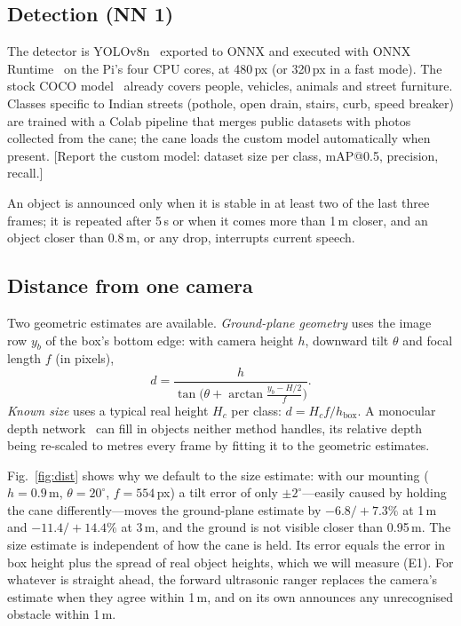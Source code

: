 \documentclass[conference]{IEEEtran}
\newcommand{\tbd}[1]{\textcolor{tbd}{[#1]}}
\begin{document}
\subsection{Detection (NN 1)}
The detector is YOLOv8n~\cite{yolov8} exported to ONNX and executed with ONNX Runtime~\cite{onnxruntime} on the Pi's four CPU cores, at 480\,px (or 320\,px in a fast mode). The stock COCO model~\cite{lin2014} already covers people, vehicles, animals and street furniture. Classes specific to Indian streets (pothole, open drain, stairs, curb, speed breaker) are trained with a Colab pipeline that merges public datasets with photos collected from the cane; the cane loads the custom model automatically when present. \tbd{Report the custom model: dataset size per class, mAP@0.5, precision, recall.}

An object is announced only when it is stable in at least two of the last three frames; it is repeated after 5\,s or when it comes more than 1\,m closer, and an object closer than 0.8\,m, or any drop, interrupts current speech.

\subsection{Distance from one camera}
Two geometric estimates are available. \emph{Ground-plane geometry} uses the image row $y_b$ of the box's bottom edge: with camera height $h$, downward tilt $\theta$ and focal length $f$ (in pixels),
\begin{equation}
d = \frac{h}{\tan\!\big(\theta + \arctan\frac{y_b - H/2}{f}\big)}.
\end{equation}
\emph{Known size} uses a typical real height $H_c$ per class: $d = H_c f / h_{\text{box}}$. A monocular depth network~\cite{ranftl2022} can fill in objects neither method handles, its relative depth being re-scaled to metres every frame by fitting it to the geometric estimates.

Fig.~\ref{fig:dist} shows why we default to the size estimate: with our mounting ($h=0.9$\,m, $\theta=20^\circ$, $f=554$\,px) a tilt error of only $\pm2^\circ$---easily caused by holding the cane differently---moves the ground-plane estimate by $-6.8/+7.3\%$ at 1\,m and $-11.4/+14.4\%$ at 3\,m, and the ground is not visible closer than 0.95\,m. The size estimate is independent of how the cane is held. Its error equals the error in box height plus the spread of real object heights, which we will measure (E1). For whatever is straight ahead, the forward ultrasonic ranger replaces the camera's estimate when they agree within 1\,m, and on its own announces any unrecognised obstacle within 1\,m.
\end{document}
